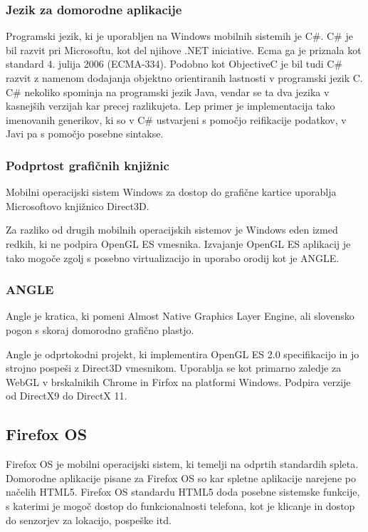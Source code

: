 \subsubsection{Jezik za domorodne aplikacije}

Programski jezik, ki je uporabljen na Windows mobilnih sistemih je C\#. C\# je bil razvit pri Microsoftu, kot del njihove .NET iniciative. Ecma ga je priznala kot standard 4. julija 2006 (ECMA-334). Podobno kot ObjectiveC je bil tudi C\# razvit z namenom dodajanja objektno orientiranih lastnosti v programski jezik C. C\# nekoliko spominja na programski jezik Java, vendar se ta dva jezika v kasnejših verzijah kar precej razlikujeta. Lep primer je implementacija tako imenovanih generikov, ki so v C\# ustvarjeni s pomočjo reifikacije podatkov, v Javi pa s pomočjo posebne sintakse. 

\subsubsection{Podprtost grafičnih knjižnic}

Mobilni operacijski sistem Windows za dostop do grafične kartice uporablja Microsoftovo knjižnico Direct3D. %

Za razliko od drugih mobilnih operacijskih sistemov je Windows eden izmed redkih, ki ne podpira OpenGL ES vmesnika. Izvajanje OpenGL ES aplikacij je tako mogoče zgolj s posebno virtualizacijo in uporabo orodij kot je ANGLE.

\subsubsection{ANGLE}
Angle \cite{angle} je kratica, ki pomeni Almost Native Graphics Layer Engine, ali slovensko pogon s skoraj domorodno grafično plastjo.

Angle je odprtokodni projekt, ki implementira OpenGL ES 2.0 specifikacijo in jo strojno pospeši z Direct3D vmesnikom. Uporablja se kot primarno zaledje za WebGL v brskalnikih Chrome in Firfox na platformi Windows. Podpira verzije od DirectX9 do DirectX 11.  

\subsection{Firefox OS}

Firefox OS \cite{firefoxos} je mobilni operacijski sistem, ki temelji na odprtih standardih spleta. Domorodne aplikacije pisane za Firefox OS so kar spletne aplikacije narejene po načelih HTML5. Firefox OS standardu HTML5 doda posebne sistemske funkcije, s katerimi je mogoč dostop do funkcionalnosti telefona, kot je klicanje in dostop do senzorjev za lokacijo, pospeške itd.

